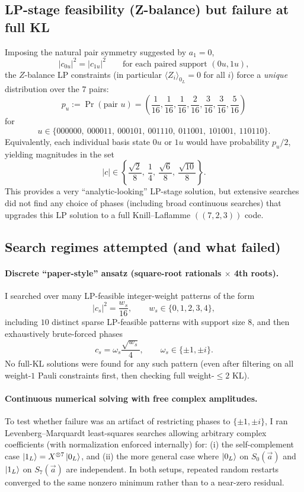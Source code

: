\documentclass[11pt]{article}
\begin{document}
\subsection{LP-stage feasibility (Z-balance) but failure at full KL}
Imposing the natural pair symmetry suggested by \(a_1=0\),
\[
|c_{0u}|^2=|c_{1u}|^2\qquad\text{for each paired support }(0u,1u),
\]
the \(Z\)-balance LP constraints (in particular \(\langle Z_i\rangle_{0_L}=0\) for all \(i\)) force a \emph{unique} distribution
over the \(7\) pairs:
\[
p_u := \Pr(\text{pair }u)=\left(\frac1{16},\frac1{16},\frac1{16},\frac2{16},\frac3{16},\frac3{16},\frac5{16}\right)
\]
for
\[
u\in\{000000,\ 000011,\ 000101,\ 001110,\ 011001,\ 101001,\ 110110\}.
\]
Equivalently, each individual basis state \(0u\) or \(1u\) would have probability \(p_u/2\), yielding magnitudes in the set
\[
|c|\in\left\{\frac{\sqrt2}{8},\ \frac14,\ \frac{\sqrt6}{8},\ \frac{\sqrt{10}}{8}\right\}.
\]
This provides a very ``analytic-looking'' LP-stage solution, but extensive searches did not find any choice of phases (including
broad continuous searches) that upgrades this LP solution to a full Knill--Laflamme \(((7,2,3))\) code.

\subsection{Search regimes attempted (and what failed)}
\paragraph{Discrete ``paper-style'' ansatz (square-root rationals \(\times\) 4th roots).}
I searched over many LP-feasible integer-weight patterns of the form
\[
|c_s|^2=\frac{w_s}{16},\qquad w_s\in\{0,1,2,3,4\},
\]
including \(10\) distinct sparse LP-feasible patterns with support size \(8\), and then exhaustively brute-forced phases
\[
c_s=\omega_s\frac{\sqrt{w_s}}{4},\qquad \omega_s\in\{\pm 1,\pm i\}.
\]
No full-KL solutions were found for any such pattern (even after filtering on all weight-\(1\) Pauli constraints first, then
checking full weight-\(\le 2\) KL).

\paragraph{Continuous numerical solving with free complex amplitudes.}
To test whether failure was an artifact of restricting phases to \(\{\pm1,\pm i\}\), I ran Levenberg--Marquardt least-squares
searches allowing arbitrary complex coefficients (with normalization enforced internally) for:
(i) the self-complement case \(\ket{1_L}=X^{\otimes 7}\ket{0_L}\), and
(ii) the more general case where \(\ket{0_L}\) on \(S_0(\vec a)\) and \(\ket{1_L}\) on \(S_7(\vec a)\) are independent.
In both setups, repeated random restarts converged to the same nonzero minimum rather than to a near-zero residual.
\end{document}
